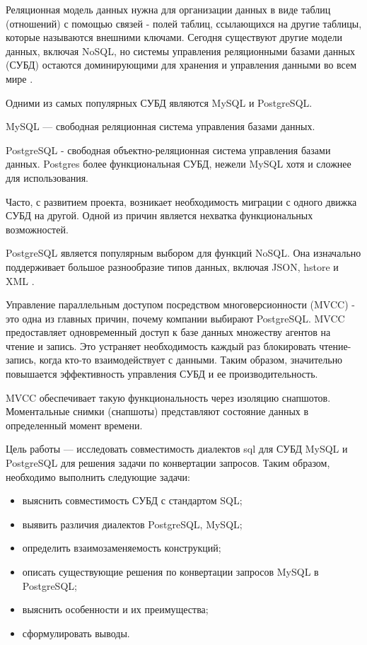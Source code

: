 \Introduction
Реляционная модель данных нужна для организации данных в виде таблиц (отношений) с помощью связей - полей таблиц, 
ссылающихся на другие таблицы, которые называются внешними ключами.  
Сегодня существуют другие модели данных, включая NoSQL, но системы управления реляционными базами данных (СУБД) остаются доминирующими для хранения 
и управления данными во всем мире \cite{db-engines-rating}. 

Одними из самых популярных СУБД являются MySQL и PostgreSQL. 

MySQL --- свободная реляционная система управления базами данных. 

PostgreSQL - свободная объектно-реляционная система управления базами данных.
Postgres более функциональная СУБД, нежели MySQL хотя и сложнее для использования.


Часто, с развитием проекта, возникает необходимость миграции с одного движка СУБД на другой. 
Одной из причин является нехватка функциональных возможностей.  

PostgreSQL является популярным выбором для функций NoSQL. 
Она изначально поддерживает большое разнообразие типов данных, включая JSON, hstore и XML \cite{postgres-types}.

Управление параллельным доступом посредством многоверсионности (MVCC) -  это одна из главных причин, почему компании выбирают PostgreSQL. 
MVCC предоставляет одновременный доступ к базе данных множеству агентов на чтение и запись. 
Это устраняет необходимость каждый раз блокировать чтение-запись, когда кто-то взаимодействует с данными. 
Таким образом, значительно повышается эффективность управления СУБД и ее производительность.

MVCC обеспечивает такую функциональность через изоляцию снапшотов. 
Моментальные снимки (снапшоты) представляют состояние данных в определенный момент времени.

Цель работы --- исследовать совместимость диалектов sql для СУБД MySQL и PostgreSQL для решения задачи по конвертации запросов.
Таким образом, необходимо выполнить следующие задачи:
\begin{itemize}
\item выяснить совместимость СУБД с стандартом SQL;
\item выявить различия диалектов PostgreSQL, MySQL;
\item определить взаимозаменяемость конструкций;
\item описать существующие решения по конвертации запросов MySQL в PostgreSQL;
\item выяснить особенности и их преимущества;
\item сформулировать выводы.
\end{itemize}

